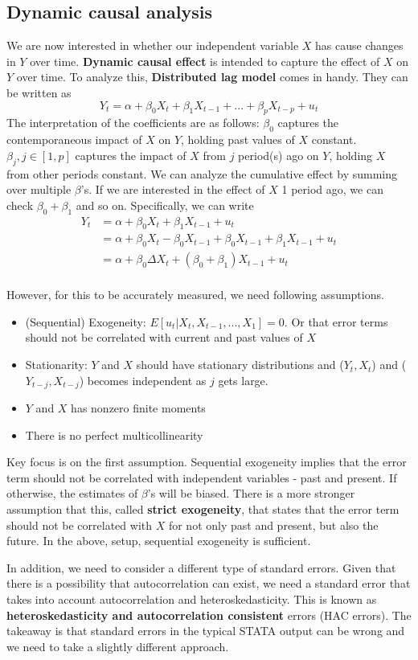 \documentclass[12pt]{article}
\theoremstyle{definition}
\theoremstyle{property}
\theoremstyle{assumption}
\theoremstyle{example}
\theoremstyle{comment}
\begin{document}
\subsection{Dynamic causal analysis}
We are now interested in whether our independent variable $X$ has cause changes in $Y$ over time. \textbf{Dynamic causal effect} is intended to capture the effect of $X$ on $Y$ over time. To analyze this, \textbf{Distributed lag model} comes in handy. They can be written as
\[
Y_t = \alpha+\beta_0X_t + \beta_1X_{t-1}+...+\beta_pX_{t-p}+u_t
\]
The interpretation of the coefficients are as follows: $\beta_0$ captures the contemporaneous impact of $X$ on $Y$, holding past values of $X$ constant. $\beta_j , j\in[1,p]$ captures the impact of $X$ from $j$ period(s) ago on $Y$, holding $X$ from other periods constant. We can analyze the cumulative effect by summing over multiple $\beta$'s. If we are interested in the effect of $X$ 1 period ago, we can check $\beta_0 + \beta_1$ and so on. Specifically, we can write
\[
\begin{aligned}
Y_t& = \alpha+\beta_0X_t + \beta_1X_{t-1}+u_t\\
&=\alpha +\beta_0 X_t - \beta_0X_{t-1} + \beta_0 X_{t-1} + \beta_1 X_{t-1}+u_t \\
&=\alpha + \beta_0\Delta X_t + (\beta_0 + \beta_1)X_{t-1}+u_t\\
\end{aligned}
\]
\par\medskip
However, for this to be accurately measured, we need following assumptions. 
\begin{itemize}
\item (Sequential) Exogeneity: $E[u_t|X_t, X_{t-1},...,X_1]=0$. Or that error terms should not be correlated with current and past values of $X$
\item Stationarity: $Y$ and $X$ should have stationary distributions and ($Y_t, X_t$) and ($Y_{t-j}, X_{t-j}$) becomes independent as $j$ gets large. 
\item $Y$ and $X$ has nonzero finite moments
\item There is no perfect multicollinearity
\end{itemize}
Key focus is on the first assumption. Sequential exogeneity implies that the error term should not be correlated with independent variables - past and present. If otherwise, the estimates of $\beta$'s will be biased. There is a more stronger assumption that this, called \textbf{strict exogeneity}, that states that the error term should not be correlated with $X$ for not only past and present, but also the future. In the above, setup, sequential exogeneity is sufficient.
\par\medskip
In addition, we need to consider a different type of standard errors. Given that there is a possibility that autocorrelation can exist, we need a standard error that takes into account autocorrelation and heteroskedasticity. This is known as \textbf{heteroskedasticity and autocorrelation consistent} errors (HAC errors). The takeaway is that standard errors in the typical STATA output can be wrong and we need to take a slightly different approach. 
\end{document}
